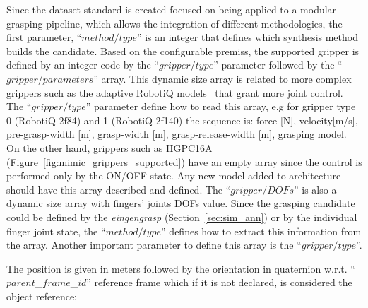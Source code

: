Since the dataset standard is created focused on being applied to a modular grasping pipeline, which allows the integration of different methodologies, the first parameter, ``$method/type$'' is an integer that defines which synthesis method builds the candidate. Based on the configurable premiss, the supported gripper is defined by an integer code by the ``$gripper/type$'' parameter followed by the ``$gripper/parameters$'' array. This dynamic size array is related to more complex grippers such as the adaptive RobotiQ models~\cite{robotiq_grippers} that grant more joint control. The ``$gripper/type$'' parameter define how to read this array, e.g for gripper type 0 (RobotiQ 2f84) and 1 (RobotiQ 2f140) the sequence is: force [N], velocity[m/s], pre-grasp-width [m], grasp-width [m], grasp-release-width [m], grasping model. On the other hand, grippers such as HGPC16A (Figure~\ref{fig:mimic_grippers_supported}) have an empty array since the control is performed only by the ON/OFF state. Any new model added to architecture should have this array described and defined. The ``$gripper/DOFs$'' is also a dynamic size array with fingers' joints \acp{DOF} value. Since the grasping candidate could be defined by the \textit{eingengrasp} (Section~\ref{sec:sim_ann}) or by the individual finger joint state, the ``$method/type$'' defines how to extract this information from the array. Another important parameter to define this array is the ``$gripper/type$''. 

The position is given in meters followed by the orientation in quaternion w.r.t. ``$parent$\_$frame$\_$id$'' reference frame which if it is not declared, is considered the object reference;



